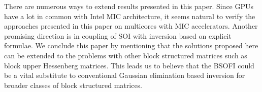 \documentclass{llncs}
\begin{document}
There are numerous ways to extend results presented in this paper.
Since GPUs have a lot in common with Intel MIC architecture, 
it seems natural to verify the approaches presented in this paper 
on multicores with MIC accelerators.
%
Another promising direction is in coupling of 
SOI with inversion based on explicit formulae. 
%
We conclude this paper by mentioning 
that the solutions proposed here can be extended to 
the problems with other block structured matrices such as
block upper Hessenberg matrices. 
This leads us to believe that the BSOFI could be a vital substitute 
to conventional Gaussian elimination based inversion
for broader classes of block structured matrices.



\end{document}
